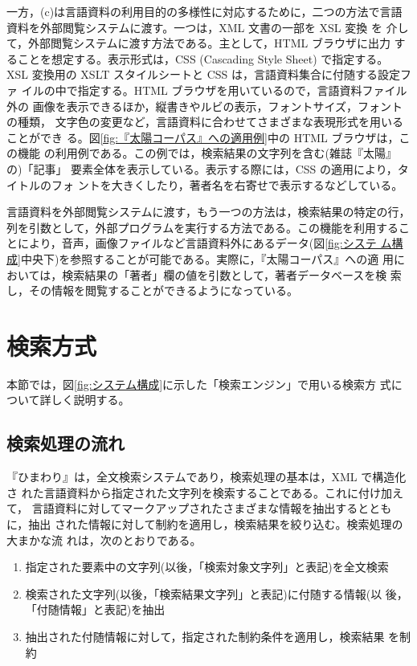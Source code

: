一方，(c)は言語資料の利用目的の多様性に対応するために，二つの方法で言語
資料を外部閲覧システムに渡す。一つは，XML 文書の一部を XSL 変換 を
介して，外部閲覧システムに渡す方法である。主として，HTML ブラウザに出力
することを想定する。表示形式は，CSS (Cascading Style Sheet) で指定する。
XSL 変換用の XSLT スタイルシートと CSS は，言語資料集合に付随する設定ファ
イルの中で指定する。HTML ブラウザを用いているので，言語資料ファイル外の
画像を表示できるほか，縦書きやルビの表示，フォントサイズ，フォントの種類，
文字色の変更など，言語資料に合わせてさまざまな表現形式を用いることができ
る。図\ref{fig:『太陽コーパス』への適用例}中の HTML ブラウザは，この機能
の利用例である。この例では，検索結果の文字列を含む(雑誌『太陽』の)「記事」
要素全体を表示している。表示する際には，CSS の適用により，タイトルのフォ
ントを大きくしたり，著者名を右寄せで表示するなどしている。

言語資料を外部閲覧システムに渡す，もう一つの方法は，検索結果の特定の行，
列を引数として，外部プログラムを実行する方法である。この機能を利用するこ
とにより，音声，画像ファイルなど言語資料外にあるデータ(図\ref{fig:システ
ム構成}中央下)を参照することが可能である。実際に，『太陽コーパス』への適
用においては，検索結果の「著者」欄の値を引数として，著者データベースを検
索し，その情報を閲覧することができるようになっている。


\section{検索方式}
\label{sec:検索方式}
本節では，図\ref{fig:システム構成}に示した「検索エンジン」で用いる検索方
式について詳しく説明する。

\subsection{検索処理の流れ}
\label{ssec:概要}
『ひまわり』は，全文検索システムであり，検索処理の基本は，XML で構造化さ
れた言語資料から指定された文字列を検索することである。これに付け加えて，
言語資料に対してマークアップされたさまざまな情報を抽出するとともに，抽出
された情報に対して制約を適用し，検索結果を絞り込む。検索処理の大まかな流
れは，次のとおりである。

\begin{enumerate}
 \item 指定された要素中の文字列(以後，「検索対象文字列」と表記)を全文検索
 \item 検索された文字列(以後，「検索結果文字列」と表記)に付随する情報(以
       後，「付随情報」と表記)を抽出
 \item 抽出された付随情報に対して，指定された制約条件を適用し，検索結果
       を制約
\end{enumerate}

